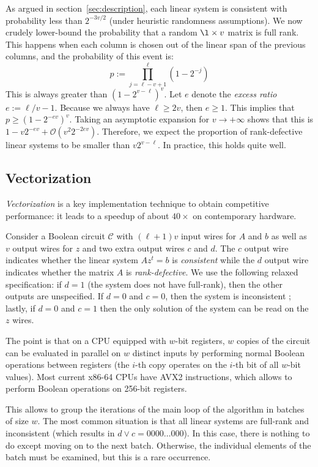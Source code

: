 \documentclass[a4paper,UKenglish,cleveref, autoref]{lipics-v2019}
\newcommand{\bigO}[1]{\ensuremath{\mathcal{O}\left( #1 \right)} }
\begin{document}
\medskip

As argued in section~\ref{sec:description}, each linear system is consistent
with probability less than $2^{-3v/2}$ (under heuristic randomness
assumptions). We now crudely lower-bound the probability that a random
$\l \times v$ matrix is full rank. This happens when each column is chosen out
of the linear span of the previous columns, and the probability of this event
is:
\[
  p := \prod_{j=\ell-v+1}^\ell \left(1 - 2^{-j} \right)
\]
This is always greater than $\left(1 - 2^{v-\ell} \right)^v$. Let $e$ denote the
\emph{excess ratio} $e := \ell/v - 1$. Because we always have $\ell \geq 2v$,
then $e \geq 1$. This implies that $p \geq \left(1 - 2^{-ev} \right)^v$. Taking
an asymptotic expansion for $v \rightarrow +\infty$ shows that this is
$1 - v 2^{-ev} + \bigO{v^2 2^{-2ev}}$. Therefore, we expect the proportion of
rank-defective linear systems to be smaller than $v 2^{v-\ell}$. In practice,
this holds quite well.


\subsection{Vectorization}

\emph{Vectorization} is a key implementation technique to obtain competitive
performance: it leads to a speedup of about $40 \times$ on contemporary
hardware.

Consider a Boolean circuit $\mathcal{C}$ with $(\ell+1)v$ input wires for $A$
and $b$ as well as $v$ output wires for $z$ and two extra output wires $c$ and
$d$. The $c$ output wire indicates whether the linear system $A z^t = b$ is
\emph{consistent} while the $d$ output wire indicates whether the matrix $A$ is
\emph{rank-defective}. We use the following relaxed specification: if $d=1$ (the
system does not have full-rank), then the other outputs are unspecified. If
$d=0$ and $c=0$, then the system is inconsistent ; lastly, if $d=0$ and $c=1$
then the only solution of the system can be read on the $z$ wires.

The point is that on a CPU equipped with $w$-bit registers, $w$ copies of the
circuit can be evaluated in parallel on $w$ distinct inputs by performing normal
Boolean operations between registers (the $i$-th copy operates on the $i$-th bit
of all $w$-bit values). Most current \textsf{x86-64} CPUs have \textsf{AVX2}
instructions, which allows to perform Boolean operations on 256-bit registers.

This allows to group the iterations of the main loop of the algorithm in batches
of size $w$. The most common situation is that all linear systems are full-rank
and inconsistent (which results in $d \vee c = 0000 \dots 000$). In this case,
there is nothing to do except moving on to the next batch. Otherwise, the
individual elements of the batch must be examined, but this is a rare occurrence.
\end{document}
